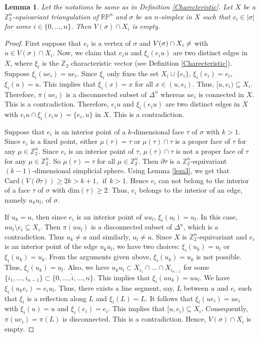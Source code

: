 \documentclass[11pt]{amsart}
\numberwithin{equation}{section}
\newtheorem{lemma}[theorem]{Lemma}
\theoremstyle{definition}
\def \bb{\mathbb}
\def \ZZ{{\bb{Z}}}
\begin{document}
\begin{lemma}\label{lem4}
Let the notations be same as in Definition 
\ref{Charecteristic}. Let $X$ be a $\ZZ_2^n$-equivariant triangulation of $\mathbb{RP}^n$ and $\sigma$ be an $n$-simplex
in $X$ such that $e_i \in |\sigma|$ for some $i \in \{0, \ldots, n\}$. Then $V(\sigma) \cap
X_i$ is empty.
\end{lemma}
\begin{proof}
First suppose that $e_i$ is a vertex of $\sigma$ and $V(\sigma) \cap X_i \neq \empty$ with $u \in V(\sigma)
\cap X_i$. Now, we claim that  $e_iu$ and $\xi_i(e_iu)$ are two distinct edges in $X$, where $\xi_i$ is the $\ZZ_2$ characteristic vector (see Definition \ref{Charecteristic}). Suppose $\xi_i(ue_i)=ue_i$. Since $\xi_i$ only fixes the set $X_i\cup\{e_i\}$, $\xi_i(e_i)=e_i$, $\xi_i(u)=u$. This implies that $\xi_i(x)=x$ for all $x\in (u,e_i)$. Thus, $[u,e_i)\subseteq X_i$. Therefore, $\pi(ue_i)$ is a disconnected subset of $\Delta^n$ whereas $ue_i$ is connected in $X$. This is a contradiction. Therefore, $e_iu$ and $\xi_i(e_iu)$ are two distinct edges in $X$ with $e_iu \cap \xi_i(e_iu)
=\{e_i, u\}$ in $X$. This is a contradiction. 

Suppose that $e_i$ is an interior point of a $k$-dimensional face $\tau$ of $\sigma$ with $k >1$. Since $e_i$ is a fixed point, either $\mu(\tau) =\tau$ or $\mu(\tau) \cap \tau$ is a proper face of $\tau$ for any $\mu\in \ZZ_2^n$. Since $e_i$ is an interior point of $\tau$, $\mu(\tau) \cap \tau$ is not a proper face of $\tau$ for any $\mu\in \ZZ_2^n$. So $\mu(\tau) = \tau$ for all $\mu\in \ZZ_2^n$. Then $\partial \tau$ is a $\ZZ_2^n$-equivariant $(k-1)$-dimensional simplicial sphere. Using Lemma \ref{lem3}, we get that $\mathrm{Card}(V(\partial \tau)) \geq 2k > k+1, ~~\mbox{if} ~~ k >1.$  
Hence $e_i$ can not belong to the interior of a face $\tau$ of $\sigma$ with $\mathrm{dim}(\tau) \geq 2$.
Thus, $e_i$ belongs to the interior of an edge, namely $u_ku_l$, of $\sigma$.

If $u_k=u$, then since $e_i$ is an interior point of $uu_l$, $\xi_i(u_l)=u_l$. In this case, $uu_l\setminus e_i \subseteq X_i$. Then $\pi(uu_l)$  is a disconnected subset of $\Delta^n$, which is a contradiction. Thus $u_k\neq u$ and similarly, $u_l\neq u$.  Since $X$ is $\ZZ_2^n$-equivariant and $e_i$ is an interior point of the edge $u_ku_l$, we have two choices: $\xi_i(u_k)
= u_l$ or $\xi_i(u_k)=u_k$. From the arguments given above, $\xi_i(u_k)=u_k$ is not possible. Thus, $\xi_i(u_k)=u_l$.
Also, we have $u_ku_l \subset X_{i_1} \cap \ldots \cap X_{i_{n-1}}$ for some $\{i_1, \ldots, i_{n-1}\} \subset \{0, \ldots, \hat{i}, \ldots, n\}$. This implies that $\xi_i(uu_k)=uu_l$. We have $\xi_i(u_ke_i)=e_iu_l$. Thus, there exists a line segment, say, $L$ between $u$ and $e_i$ such that $\xi_i$ is a reflection along $L$ and $\xi_i(L)=L$. It follows that $\xi_i(ue_i)=ue_i$ with $\xi_i(u)=u$ and $\xi_i(e_i)=e_i$. This implies that $[u,e_i)\subseteq X_i$. Consequently, $\pi(ue_i)=\pi(L)$ is disconnected. This is a contradiction. Hence, $V(\sigma)\cap X_i$ is empty.
\end{proof}
  
\end{document}
